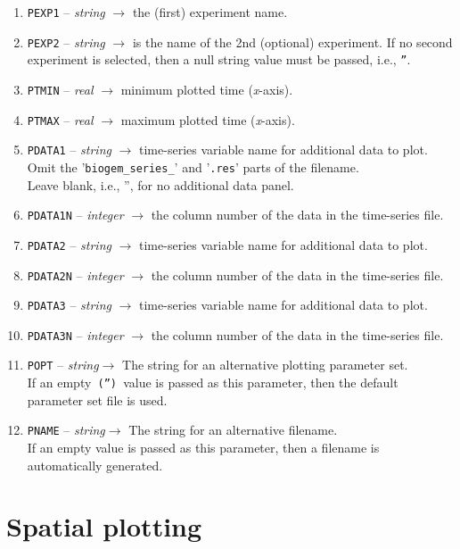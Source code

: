 \documentclass[11pt,fleqn]{book} %
\begin{document}
\begin{enumerate}
\item \texttt{PEXP1} -- \textit{string} \(\rightarrow\) the (first) experiment name.
\item \texttt{PEXP2} -- \textit{string} \(\rightarrow\)  is the name of the 2nd (optional) experiment. If no second experiment is selected, then a null string value must be passed, i.e., \texttt{''}.
\item \texttt{PTMIN} -- \textit{real} \(\rightarrow\) minimum plotted time (\textit{x}-axis).
\item \texttt{PTMAX} -- \textit{real} \(\rightarrow\) maximum plotted time (\textit{x}-axis).
\item \texttt{PDATA1} -- \textit{string} \(\rightarrow\) time-series variable name for additional data to plot.
\\Omit the '\texttt{biogem\_series\_}' and '\texttt{.res}' parts of the filename.
\\Leave blank, i.e., '', for no additional data panel.
\item \texttt{PDATA1N} -- \textit{integer} \(\rightarrow\) the column number of the data in the time-series file.
\item \texttt{PDATA2} -- \textit{string} \(\rightarrow\) time-series variable name for additional data to plot.
\item \texttt{PDATA2N} -- \textit{integer} \(\rightarrow\) the column number of the data in the time-series file.
\item \texttt{PDATA3} -- \textit{string} \(\rightarrow\) time-series variable name for additional data to plot.
\item \texttt{PDATA3N} -- \textit{integer} \(\rightarrow\) the column number of the data in the time-series file.
\item \texttt{POPT} -- \textit{string}\(\rightarrow\) The string for an alternative plotting parameter set.
\\If an empty\texttt{ ('') }value is passed as this parameter, then the default parameter set file is used.
\item \texttt{PNAME}  -- \textit{string}\(\rightarrow\) The string for an alternative filename.
\\If an empty value is passed as this parameter, then a filename is automatically generated.
\end{enumerate}


\section{Spatial plotting}
\end{document}
